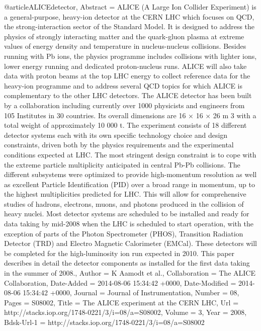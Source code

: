 @article{ALICEdetector,
	Abstract = {ALICE (A Large Ion Collider Experiment) is a general-purpose, heavy-ion detector at the CERN LHC which focuses on QCD, the strong-interaction sector of the Standard Model. It is designed to address the physics of strongly interacting matter and the quark-gluon plasma at extreme values of energy density and temperature in nucleus-nucleus collisions. Besides running with Pb ions, the physics programme includes collisions with lighter ions, lower energy running and dedicated proton-nucleus runs. ALICE will also take data with proton beams at the top LHC energy to collect reference data for the heavy-ion programme and to address several QCD topics for which ALICE is complementary to the other LHC detectors. The ALICE detector has been built by a collaboration including currently over 1000 physicists and engineers from 105 Institutes in 30 countries. Its overall dimensions are 16 × 16 × 26 m 3 with a total weight of approximately 10 000 t. The experiment consists of 18 different detector systems each with its own specific technology choice and design constraints, driven both by the physics requirements and the experimental conditions expected at LHC. The most stringent design constraint is to cope with the extreme particle multiplicity anticipated in central Pb-Pb collisions. The different subsystems were optimized to provide high-momentum resolution as well as excellent Particle Identification (PID) over a broad range in momentum, up to the highest multiplicities predicted for LHC. This will allow for comprehensive studies of hadrons, electrons, muons, and photons produced in the collision of heavy nuclei. Most detector systems are scheduled to be installed and ready for data taking by mid-2008 when the LHC is scheduled to start operation, with the exception of parts of the Photon Spectrometer (PHOS), Transition Radiation Detector (TRD) and Electro Magnetic Calorimeter (EMCal). These detectors will be completed for the high-luminosity ion run expected in 2010. This paper describes in detail the detector components as installed for the first data taking in the summer of 2008.},
	Author = {K Aamodt et al.},
	Collaboration = {The ALICE Collaboration},
	Date-Added = {2014-08-06 15:34:42 +0000},
	Date-Modified = {2014-08-06 15:34:42 +0000},
	Journal = {Journal of Instrumentation},
	Number = {08},
	Pages = {S08002},
	Title = {The ALICE experiment at the CERN LHC},
	Url = {http://stacks.iop.org/1748-0221/3/i=08/a=S08002},
	Volume = {3},
	Year = {2008},
	Bdsk-Url-1 = {http://stacks.iop.org/1748-0221/3/i=08/a=S08002}}


